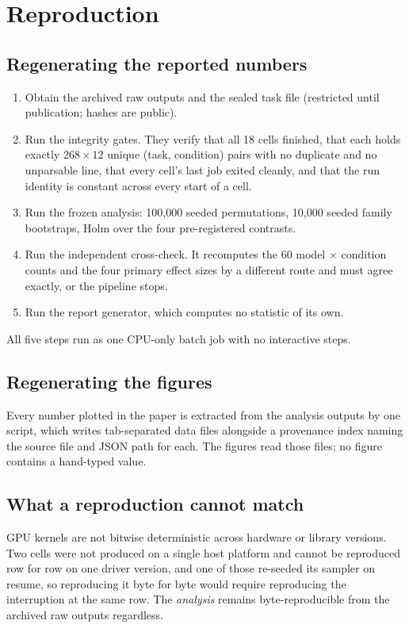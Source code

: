 \documentclass[10pt]{article}
\begin{document}
\section{Reproduction}

\subsection{Regenerating the reported numbers}

\begin{enumerate}[leftmargin=1.6em,itemsep=1pt]
\item Obtain the archived raw outputs and the sealed task file (restricted until publication; hashes are public).
\item Run the integrity gates. They verify that all 18 cells finished, that each holds exactly $268\times12$
unique (task, condition) pairs with no duplicate and no unparsable line, that every cell's last job exited
cleanly, and that the run identity is constant across every start of a cell.
\item Run the frozen analysis: 100{,}000 seeded permutations, 10{,}000 seeded family bootstraps, Holm over the
four pre-registered contrasts.
\item Run the independent cross-check. It recomputes the 60 model $\times$ condition counts and the four primary
effect sizes by a different route and must agree exactly, or the pipeline stops.
\item Run the report generator, which computes no statistic of its own.
\end{enumerate}

All five steps run as one CPU-only batch job with no interactive steps.

\subsection{Regenerating the figures}

Every number plotted in the paper is extracted from the analysis outputs by one script, which writes
tab-separated data files alongside a provenance index naming the source file and JSON path for each. The figures
read those files; no figure contains a hand-typed value.

\subsection{What a reproduction cannot match}

GPU kernels are not bitwise deterministic across hardware or library versions. Two cells were not produced on a
single host platform and cannot be reproduced row for row on one driver version, and one of those re-seeded its
sampler on resume, so reproducing it byte for byte would require reproducing the interruption at the same row. The
\emph{analysis} remains byte-reproducible from the archived raw outputs regardless.
\end{document}
